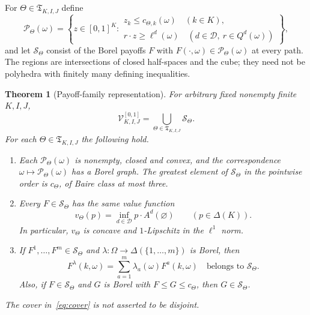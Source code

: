 \documentclass[11pt,a4paper]{article}
\newtheorem{theorem}{Theorem}[section]
\theoremstyle{definition}
\theoremstyle{remark}
\newcommand{\DD}{\mathcal D}
\newcommand{\VV}{\mathcal V}
\begin{document}
For $\Theta\in\mathfrak T_{K,I,J}$ define
\begin{equation}\label{eq:region}
 \mathcal P_\Theta(\omega)=
 \left\{z\in[0,1]^K:
 \begin{array}{l}
 z_k\leq c_{\Theta,k}(\omega)\quad(k\in K),\\
 r\cdot z\geq\ell^d(\omega)\quad(d\in\DD,\ r\in Q^d(\omega))
 \end{array}\right\},
\end{equation}
and let $\mathcal S_\Theta$ consist of the Borel payoffs $F$ with
$F(\cdot,\omega)\in\mathcal P_\Theta(\omega)$ at every path.
The regions are intersections of closed half-spaces and the cube;
they need not be polyhedra with finitely many defining inequalities.

\begin{theorem}[Payoff-family representation]\label{thm:families}
For arbitrary fixed nonempty finite $K,I,J$,
\begin{equation}\label{eq:cover}
 \VV^{[0,1]}_{K,I,J}
       =\bigcup_{\Theta\in\mathfrak T_{K,I,J}}\mathcal S_\Theta.
\end{equation}
For each $\Theta\in\mathfrak T_{K,I,J}$ the following hold.
\begin{enumerate}[label=\textup{(\roman*)},leftmargin=*,itemsep=3pt]
\item Each $\mathcal P_\Theta(\omega)$ is nonempty, closed and convex,
and the correspondence $\omega\mapsto\mathcal P_\Theta(\omega)$
has a Borel graph. The greatest element of $\mathcal S_\Theta$
in the pointwise order is $c_\Theta$, of Baire class at most three.
\item Every $F\in\mathcal S_\Theta$ has the same value function
\begin{equation}\label{eq:familyvalue}
 v_\Theta(p)=\inf_{d\in\DD}p\cdot A^d(\varnothing)
                    \qquad(p\in\Delta(K)).
\end{equation}
In particular, $v_\Theta$ is concave and $1$-Lipschitz in the
$\ell^1$ norm.
\item If $F^1,\ldots,F^m\in\mathcal S_\Theta$ and
$\lambda:\Omega\to\Delta(\{1,\ldots,m\})$ is Borel, then
\[
 F^\lambda(k,\omega)=\sum_{a=1}^m\lambda_a(\omega)F^a(k,\omega)
             \quad\text{belongs to }\mathcal S_\Theta.
\]
Also, if $F\in\mathcal S_\Theta$ and $G$ is Borel with
$F\leq G\leq c_\Theta$, then $G\in\mathcal S_\Theta$.
\end{enumerate}
The cover in~\eqref{eq:cover} is not asserted to be disjoint.
\end{theorem}
\end{document}
